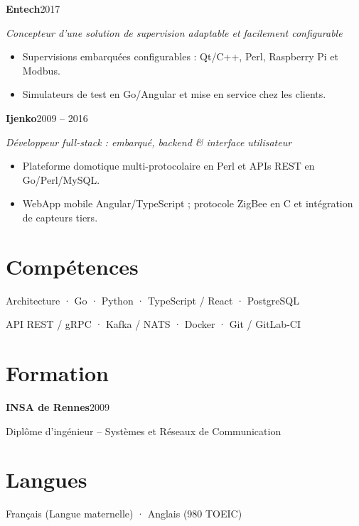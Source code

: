 \documentclass[a4paper,10pt]{article}
\newcommand{\experience}[3]{\textbf{#1}\hfill{\small\color{muted}#2}\par\textit{#3}\par}
\newcommand{\experiencegap}{\vspace{8pt plus 1fill}}
\begin{document}
\experience{Entech}{2017}{Concepteur d'une solution de supervision adaptable et facilement configurable}
\begin{itemize}
\item Supervisions embarquées configurables : Qt/C++, Perl, Raspberry Pi et Modbus.
\item Simulateurs de test en Go/Angular et mise en service chez les clients.
\end{itemize}
\experiencegap

\experience{Ijenko}{2009 – 2016}{Développeur full-stack : embarqué, backend \& interface utilisateur}
\begin{itemize}
\item Plateforme domotique multi-protocolaire en Perl et APIs REST en Go/Perl/MySQL.
\item WebApp mobile Angular/TypeScript ; protocole ZigBee en C et intégration de capteurs tiers.
\end{itemize}
\experiencegap

\section{Compétences}
Architecture · Go · Python · TypeScript / React · PostgreSQL\par
API REST / gRPC · Kafka / NATS · Docker · Git / GitLab-CI\par

\section{Formation}
\textbf{INSA de Rennes}\hfill2009\par
Diplôme d'ingénieur – Systèmes et Réseaux de Communication\par

\section{Langues}
Français (Langue maternelle) · Anglais (980 TOEIC)\par
\end{document}
